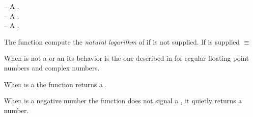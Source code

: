 \documentclass[../Comparisons-Predicates.tex]{subfiles}
\begin{document}

\DSyntax{}

   \RArrow{} 

\DArgsNValues{}

 -- A .\\
 -- A .\\
 -- A .

\DDescription{}

The function  compute the \emph{natural logarithm} of
 if  is not supplied. If  is
supplied   \code{)} $\equiv$   \code{))}

\noindent
When  is not a  or an
 its behavior is the one described in
\cite{1996:ANSIHyperSpec} for regular floating point numbers and complex
numbers.

\noindent
When  is a  the function 
returns a .

\noindent
When  is a negative 
number the function  does not signal a
, it quietly returns a
 number.
\end{document}
